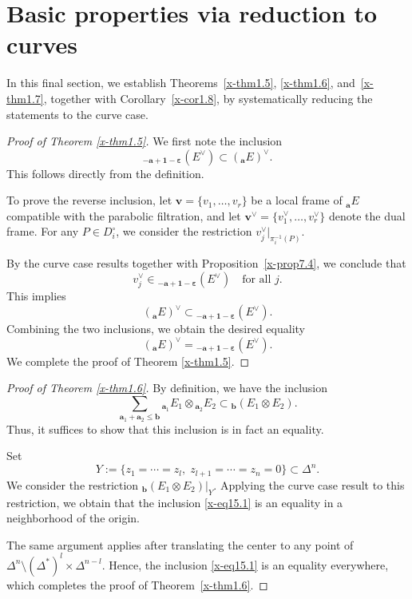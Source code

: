 \documentclass[12pt,twoside]{amsart}
\theoremstyle{definition}
\begin{document}
\section{Basic properties via reduction to curves}\label{x-sec15}

In this final section, we establish Theorems~\ref{x-thm1.5},
\ref{x-thm1.6}, and~\ref{x-thm1.7}, together with
Corollary~\ref{x-cor1.8}, by systematically reducing the statements
to the curve case.

\begin{proof}[Proof of Theorem \ref{x-thm1.5}]
We first note the inclusion
\[
{}_{-\bm a + \bm 1 - \bm \varepsilon}\left(E^\vee\right)
\subset \left({}_{\bm a} E\right)^\vee.
\]
This follows directly from the definition. 

To prove the reverse inclusion, let
$\bm v = \{v_1,\ldots,v_r\}$ be a local frame of ${}_{\bm a}E$
compatible with the parabolic filtration, and let
$\bm v^\vee = \{v_1^\vee,\ldots,v_r^\vee\}$ denote the dual frame.
For any $P \in D_i^\circ$, we consider the restriction
$v_j^\vee|_{\pi_i^{-1}(P)}$.

By the curve case results
\cite[Theorems~1.12 and~13.2]{fujino-fujisawa-ono}
together with Proposition~\ref{x-prop7.4},
we conclude that
\[
v_j^\vee \in
{}_{-\bm a + \bm 1 - \bm \varepsilon}\left(E^\vee\right)
\quad \text{for all } j.
\]
This implies
\[
\left({}_{\bm a}E\right)^\vee
\subset
{}_{-\bm a + \bm 1 - \bm \varepsilon}\left(E^\vee\right).
\]
Combining the two inclusions, we obtain the desired equality
\[
\left({}_{\bm a}E\right)^\vee
=
{}_{-\bm a + \bm 1 - \bm \varepsilon}\left(E^\vee\right).
\]
We complete the proof of Theorem \ref{x-thm1.5}. 
\end{proof}

\begin{proof}[Proof of Theorem \ref{x-thm1.6}]
By definition, we have the inclusion
\begin{equation}\label{x-eq15.1}
\sum_{\bm a_1 + \bm a_2 \leq \bm b}
{}_{\bm a_1}E_1 \otimes {}_{\bm a_2}E_2
\subset
{}_{\bm b}(E_1 \otimes E_2).
\end{equation}
Thus, it suffices to show that this inclusion is in fact an equality.

Set
\[
Y := \{ z_1 = \cdots = z_l,\; z_{l+1} = \cdots = z_n = 0 \}
\subset \Delta^n.
\]
We consider the restriction
${}_{\bm b}(E_1 \otimes E_2)|_Y$.
Applying the curve case result
\cite[Theorem~1.14]{fujino-fujisawa-ono}
to this restriction, we obtain that
the inclusion \eqref{x-eq15.1} is an equality
in a neighborhood of the origin.

The same argument applies after translating the center
to any point of
$\Delta^n \setminus (\Delta^*)^l \times \Delta^{n-l}$.
Hence, the inclusion \eqref{x-eq15.1} is an equality everywhere,
which completes the proof of Theorem~\ref{x-thm1.6}.
\end{proof}
\end{document}
